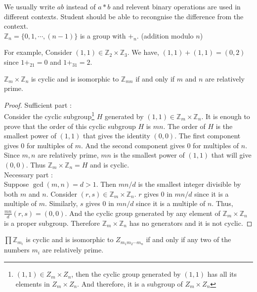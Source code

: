 \begin{remark}
	We usually write $ab$ instead of $a \ast b$ and relevent binary operations are used in different contexts. Student should be able to recongnise the difference from the context.\\

	$\mathbb{Z}_n = \{ 0,1,\cdots,(n-1) \}$ is a group with $+_n$. (addition modulo $n$)

	For example, Consider $(1,1) \in \mathbb{Z}_2 \times \mathbb{Z}_3$. We have, $(1,1)+(1,1) = (0,2)$ since $1+_21=0$ and $1+_31 = 2$.
\end{remark}

\begin{theorem}
	$\mathbb{Z}_m \times \mathbb{Z}_n$ is cyclic and is isomorphic to $\mathbb{Z}_{mn}$ if and only if $m$ and $n$ are relatively prime.
\end{theorem}
\begin{proof}
	Sufficient part :\\
	Consider the cyclic subgroup\footnote{$(1,1) \in Z_m \times Z_n$, then the cyclic group generated by $(1,1)$ has all its elements in $Z_m \times Z_n$. And therefore, it is a subgroup of $Z_m \times Z_n$} $H$ generated by $(1,1) \in \mathbb{Z}_m \times \mathbb{Z}_n$.
	It is enough to prove that the order of this cyclic subgroup $H$ is $mn$.
	The order of $H$ is the smallest power of $(1,1)$ that gives the identity $(0,0)$.
	The first component gives $0$ for multiples of $m$.
	And the second component gives $0$ for multiples of $n$.
	Since $m,n$ are relatively prime, $mn$ is the smallest power of $(1,1)$ that will give $(0,0)$.
	Thus $\mathbb{Z}_m \times \mathbb{Z}_n = H$ and is cyclic.\\

	Necessary part :\\
	Suppose $\gcd(m,n) = d > 1$.
	Then $mn/d$ is the smallest integer divisible by both $m$ and $n$.
	Consider $(r,s) \in \mathbb{Z}_m \times \mathbb{Z}_n$.
	$r$ gives $0$ in $mn/d$ since it is a multiple of $m$.
	Similarly, $s$ gives $0$ in $mn/d$ since it is a multiple of $n$.
	Thus, $\frac{mn}{d} (r,s) = (0,0)$.
	And the cyclic group generated by any element of $\mathbb{Z}_m \times \mathbb{Z}_n$ is a proper subgroup.
	Therefore $\mathbb{Z}_m \times \mathbb{Z}_n$ has no generators and it is not cyclic.
\end{proof}

\begin{corollary}
	$\prod \mathbb{Z}_{m_i}$ is cyclic and is isomorphic to $Z_{m_1m_2\cdots m_n}$ if and only if any two of the numbers $m_i$ are relatively prime.
\end{corollary}

